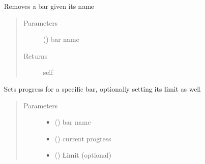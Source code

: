 \documentclass[a4paper,10pt,english]{sphinxmanual}
\begin{document}
\begin{fulllineitems}
\begin{fulllineitems}
\end{fulllineitems}


\begin{fulllineitems}
\label{\detokenize{api/termtools.terminal.ProgressBarController:termtools.terminal.ProgressBarController.remove_bar}}
Removes a bar given its name
\begin{quote}\begin{description}
\item[{Parameters}] \leavevmode
{} () \textendash{} bar name

\item[{Returns}] \leavevmode
self

\end{description}\end{quote}

\end{fulllineitems}


\begin{fulllineitems}
\label{\detokenize{api/termtools.terminal.ProgressBarController:termtools.terminal.ProgressBarController.set_progress}}
Sets progress for a specific bar, optionally setting its limit as well
\begin{quote}\begin{description}
\item[{Parameters}] \leavevmode\begin{itemize}
\item {} 
 () \textendash{} bar name

\item {} 
 () \textendash{} current progress

\item {} 
 () \textendash{} Limit (optional)

\end{itemize}


\end{description}
\end{quote}
\end{fulllineitems}
\end{fulllineitems}
\end{document}
